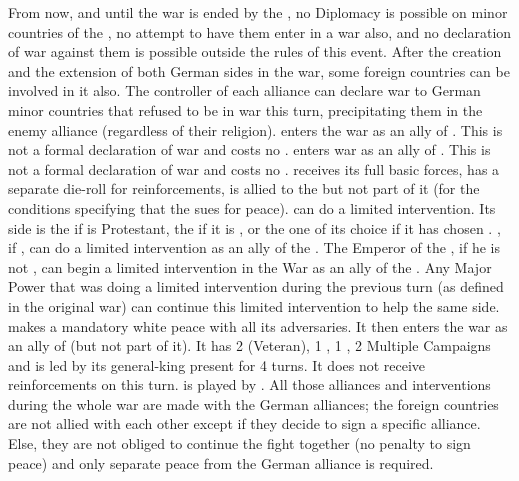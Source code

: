 \phevnt
\aparag From now, and until the war is ended by the , no Diplomacy is possible on minor countries of the \HRE, no
attempt to have them enter in a war also, and no declaration of war against
them is possible outside the rules of this event.
\aparag After the creation and the extension of both German sides in the war,
some foreign countries can be involved in it also.
\aparag The controller of each alliance can declare war to German minor
countries that refused to be in war this turn, precipitating them in the enemy
alliance (regardless of their religion).
\aparag \SPA enters the war as an ally of \ligue. This is not a formal
declaration of war and costs no \STAB.
\aparag \HOLhol enters war as an ally of \alliance.  This is not a formal
declaration of war and costs no \STAB. \HOLMin receives its full basic forces,
has a separate die-roll for reinforcements, is allied to the \alliance but not
part of it (for the conditions specifying that the \alliance sues for peace).
\aparag \ENG can do a limited intervention. Its side is the \alliance if \ENG
is Protestant, the \ligue if it is \CATHCR, or the one of its choice if it has
chosen \CATHCO.
\aparag \SUE, if \PROTRIG, can do a limited intervention as an ally of the
\alliance.
\aparag The Emperor of the \HRE, if he is not \HAB, can begin a limited
intervention in the War as an ally of the \ligue.
\aparag Any Major Power that was doing a limited intervention during the
previous turn (as defined in the original war) can continue this limited
intervention to help the same side.
\label{pIV:TYW:Danish Crusade}
\DANMin makes a mandatory white peace with all its adversaries.  It then
enters the war as an ally of \alliance (but not part of it). It has 2 \ARMY
\faceplus (Veteran), 1 \FLEET \facemoins, 1 \fortress, 2 Multiple Campaigns
and is led by its general-king  present for 4 turns.  It
does not receive reinforcements on this turn. \DANMin is played by \ENG.
\aparag All those alliances and interventions during the whole war are made
with the German alliances; the foreign countries are not allied with each
other except if they decide to sign a specific alliance. Else, they are not
obliged to continue the fight together (no penalty to sign peace) and only
separate peace from the German alliance is required.

